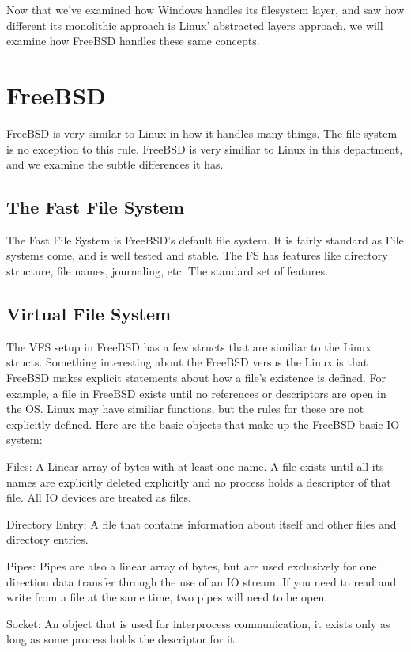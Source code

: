 \documentclass[10pt,letterpaper,onecolumn,draftclsnofoot]{IEEEtran}
\begin{document}
  Now that we've examined how Windows handles its filesystem layer, and saw how
  different its monolithic approach is Linux' abstracted layers approach, we will
  examine how FreeBSD handles these same concepts.

\section{FreeBSD}
  FreeBSD is very similar to Linux in how it handles many things. The file system
  is no exception to this rule. FreeBSD is very similiar to Linux in this department,
  and we examine the subtle differences it has.
 \subsection{The Fast File System}
 The Fast File System is FreeBSD's default file system. It is fairly standard as
 File systems come, and is well tested and stable. The FS has features like directory
 structure, file names, journaling, etc. The standard set of features.
 \subsection{Virtual File System}
 The VFS setup in FreeBSD has a few structs that are similiar to the Linux structs.
 Something interesting about the FreeBSD versus the Linux is that FreeBSD
 makes explicit statements about how a file's existence is defined. For example,
 a file in FreeBSD exists until no references or descriptors are open in the OS.
 Linux may have similiar functions, but the rules for these are not explicitly
 defined. Here are the basic objects that make up the FreeBSD basic IO system:
 \cite{freebsd2016}
 \begin{description}
   \item Files: A Linear array of bytes with at least one name. A file exists
   until all its names are explicitly deleted explicitly and no process holds a
   descriptor of that file. All IO devices are treated as files.
   \item Directory Entry: A file that contains information about itself and
   other files and directory entries.
   \item Pipes: Pipes are also a linear array of bytes, but are used exclusively
   for one direction data transfer through the use of an IO stream. If you need
   to read and write from a file at the same time, two pipes will need to be open.
   \item Socket: An object that is used for interprocess communication, it exists
   only as long as some process holds the descriptor for it.
 \end{description}
\end{document}
